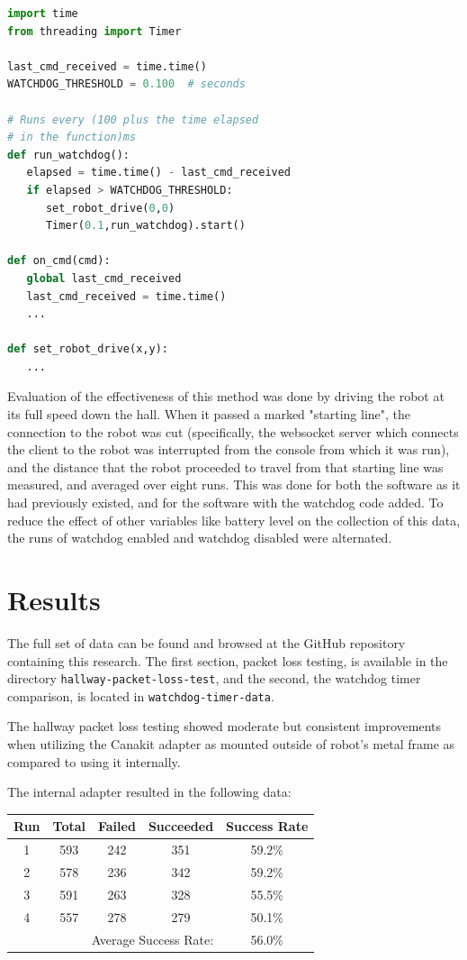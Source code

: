 \documentclass{IEEEtran}
\begin{document}
\begin{lstlisting}[language=Python,basicstyle=\ttfamily]
import time
from threading import Timer

last_cmd_received = time.time()
WATCHDOG_THRESHOLD = 0.100  # seconds

# Runs every (100 plus the time elapsed
# in the function)ms
def run_watchdog():
   elapsed = time.time() - last_cmd_received
   if elapsed > WATCHDOG_THRESHOLD:
      set_robot_drive(0,0)
      Timer(0.1,run_watchdog).start() 

def on_cmd(cmd):
   global last_cmd_received
   last_cmd_received = time.time()
   ...

def set_robot_drive(x,y):
   ...
\end{lstlisting}


Evaluation of the effectiveness of this method was done by driving the robot
at its full speed down the hall. When it passed a marked "starting line",
the connection to the robot was cut (specifically, the websocket server which
connects the client to the robot was interrupted from the console from which
it was run), and the distance that the robot proceeded to travel from that
starting line was measured, and averaged over eight runs.
This was done for both the software as it had
previously existed, and for the software with the watchdog code added. To
reduce the effect of other variables like battery level on the collection of
this data, the runs of watchdog enabled and watchdog disabled were alternated.

\section{Results}
The full set of data can be found and browsed at the GitHub repository
containing this research\cite{uropgithub}. The first section, packet loss
testing, is available in the directory \texttt{hallway-packet-loss-test},
and the second, the watchdog timer comparison, is located in
\texttt{watchdog-timer-data}.

The hallway packet loss testing showed moderate but consistent improvements
when utilizing the Canakit adapter as mounted outside of robot's metal frame
as compared to using it internally.

The internal adapter resulted in the following data:

\begin{tabular}{ c | c | c | c | c }
  Run & Total & Failed & Succeeded & Success Rate \\ \hline
  1 & 593 & 242 & 351 & 59.2\% \\
  2 & 578 & 236 & 342 & 59.2\% \\
  3 & 591 & 263 & 328 & 55.5\% \\
  4 & 557 & 278 & 279 & 50.1\% \\
  \hline
  \multicolumn{4}{r}{Average Success Rate:} & 56.0\%
\end{tabular}
\end{document}
